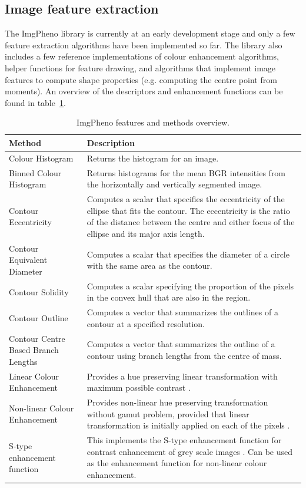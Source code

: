 \documentclass[3p,twocolumn,10pt]{elsarticle}
\begin{document}
\subsection{Image feature extraction}

The ImgPheno library is currently at an early development stage and only a few feature extraction algorithms have been implemented so far. The library also includes a few reference implementations of colour enhancement algorithms, helper functions for feature drawing, and algorithms that implement image features to compute shape properties (e.g. computing the centre point from moments). An overview of the descriptors and enhancement functions can be found in table~\ref{tbl:imgpheno-methods}.

\begin{table}[h]\footnotesize
    \caption{ImgPheno features and methods overview.}
    \begin{center}
    \begin{tabular}{p{3.5cm}p{3.5cm}}
    \toprule
    \textbf{Method} & \textbf{Description} \\
    \midrule
    Colour Histogram & Returns the histogram for an image. \\
    Binned Colour Histogram & Returns histograms for the mean BGR intensities from the horizontally and vertically segmented image. \\
    Contour Eccentricity & Computes a scalar that specifies the eccentricity of the ellipse that fits the contour. The eccentricity is the ratio of the distance between the centre and either focus of the ellipse and its major axis length. \\
    Contour Equivalent Diameter & Computes a scalar that specifies the diameter of a circle with the same area as the contour. \\
    Contour Solidity & Computes a scalar specifying the proportion of the pixels in the convex hull that are also in the region. \\
    Contour Outline & Computes a vector that summarizes the outlines of a contour at a specified resolution. \\
    Contour Centre Based Branch Lengths & Computes a vector that summarizes the outline of a contour using branch lengths from the centre of mass. \\
    \midrule
    Linear Colour Enhancement & Provides a hue preserving linear transformation with maximum possible contrast \citep{Naik2003}. \\
    Non-linear Colour Enhancement & Provides non-linear hue preserving transformation without gamut problem, provided that linear transformation is initially applied on each of the pixels \citep{Naik2003}. \\
    S-type enhancement function & This implements the S-type enhancement function for contrast enhancement of grey scale images \citep{Naik2003}. Can be used as the enhancement function for non-linear colour enhancement. \\
    \bottomrule
    \end{tabular}
    \end{center}
    \label{tbl:imgpheno-methods}
\end{table}
\end{document}
